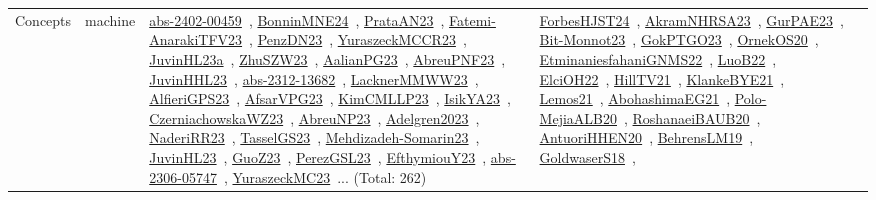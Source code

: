 {\begin{longtable}{lp{3cm}>{\raggedright\arraybackslash}p{6cm}>{\raggedright\arraybackslash}p{6cm}>{\raggedright\arraybackslash}p{8cm}}
Concepts & machine & \href{../works/abs-2402-00459.pdf}{abs-2402-00459}~\cite{abs-2402-00459}, \href{../works/BonninMNE24.pdf}{BonninMNE24}~\cite{BonninMNE24}, \href{../works/PrataAN23.pdf}{PrataAN23}~\cite{PrataAN23}, \href{../works/Fatemi-AnarakiTFV23.pdf}{Fatemi-AnarakiTFV23}~\cite{Fatemi-AnarakiTFV23}, \href{../works/PenzDN23.pdf}{PenzDN23}~\cite{PenzDN23}, \href{../works/YuraszeckMCCR23.pdf}{YuraszeckMCCR23}~\cite{YuraszeckMCCR23}, \href{../works/JuvinHL23a.pdf}{JuvinHL23a}~\cite{JuvinHL23a}, \href{../works/ZhuSZW23.pdf}{ZhuSZW23}~\cite{ZhuSZW23}, \href{../works/AalianPG23.pdf}{AalianPG23}~\cite{AalianPG23}, \href{../works/AbreuPNF23.pdf}{AbreuPNF23}~\cite{AbreuPNF23}, \href{../works/JuvinHHL23.pdf}{JuvinHHL23}~\cite{JuvinHHL23}, \href{../works/abs-2312-13682.pdf}{abs-2312-13682}~\cite{abs-2312-13682}, \href{../works/LacknerMMWW23.pdf}{LacknerMMWW23}~\cite{LacknerMMWW23}, \href{../works/AlfieriGPS23.pdf}{AlfieriGPS23}~\cite{AlfieriGPS23}, \href{../works/AfsarVPG23.pdf}{AfsarVPG23}~\cite{AfsarVPG23}, \href{../works/KimCMLLP23.pdf}{KimCMLLP23}~\cite{KimCMLLP23}, \href{../works/IsikYA23.pdf}{IsikYA23}~\cite{IsikYA23}, \href{../works/CzerniachowskaWZ23.pdf}{CzerniachowskaWZ23}~\cite{CzerniachowskaWZ23}, \href{../works/AbreuNP23.pdf}{AbreuNP23}~\cite{AbreuNP23}, \href{../works/Adelgren2023.pdf}{Adelgren2023}~\cite{Adelgren2023}, \href{../works/NaderiRR23.pdf}{NaderiRR23}~\cite{NaderiRR23}, \href{../works/TasselGS23.pdf}{TasselGS23}~\cite{TasselGS23}, \href{../works/Mehdizadeh-Somarin23.pdf}{Mehdizadeh-Somarin23}~\cite{Mehdizadeh-Somarin23}, \href{../works/JuvinHL23.pdf}{JuvinHL23}~\cite{JuvinHL23}, \href{../works/GuoZ23.pdf}{GuoZ23}~\cite{GuoZ23}, \href{../works/PerezGSL23.pdf}{PerezGSL23}~\cite{PerezGSL23}, \href{../works/EfthymiouY23.pdf}{EfthymiouY23}~\cite{EfthymiouY23}, \href{../works/abs-2306-05747.pdf}{abs-2306-05747}~\cite{abs-2306-05747}, \href{../works/YuraszeckMC23.pdf}{YuraszeckMC23}~\cite{YuraszeckMC23}... (Total: 262) & \href{../works/ForbesHJST24.pdf}{ForbesHJST24}~\cite{ForbesHJST24}, \href{../works/AkramNHRSA23.pdf}{AkramNHRSA23}~\cite{AkramNHRSA23}, \href{../works/GurPAE23.pdf}{GurPAE23}~\cite{GurPAE23}, \href{../works/Bit-Monnot23.pdf}{Bit-Monnot23}~\cite{Bit-Monnot23}, \href{../works/GokPTGO23.pdf}{GokPTGO23}~\cite{GokPTGO23}, \href{../works/OrnekOS20.pdf}{OrnekOS20}~\cite{OrnekOS20}, \href{../works/EtminaniesfahaniGNMS22.pdf}{EtminaniesfahaniGNMS22}~\cite{EtminaniesfahaniGNMS22}, \href{../works/LuoB22.pdf}{LuoB22}~\cite{LuoB22}, \href{../works/ElciOH22.pdf}{ElciOH22}~\cite{ElciOH22}, \href{../works/HillTV21.pdf}{HillTV21}~\cite{HillTV21}, \href{../works/KlankeBYE21.pdf}{KlankeBYE21}~\cite{KlankeBYE21}, \href{../works/Lemos21.pdf}{Lemos21}~\cite{Lemos21}, \href{../works/AbohashimaEG21.pdf}{AbohashimaEG21}~\cite{AbohashimaEG21}, \href{../works/Polo-MejiaALB20.pdf}{Polo-MejiaALB20}~\cite{Polo-MejiaALB20}, \href{../works/RoshanaeiBAUB20.pdf}{RoshanaeiBAUB20}~\cite{RoshanaeiBAUB20}, \href{../works/AntuoriHHEN20.pdf}{AntuoriHHEN20}~\cite{AntuoriHHEN20}, \href{../works/BehrensLM19.pdf}{BehrensLM19}~\cite{BehrensLM19}, \href{../works/GoldwaserS18.pdf}{GoldwaserS18}~\cite{GoldwaserS18}, 
\end{longtable}}

